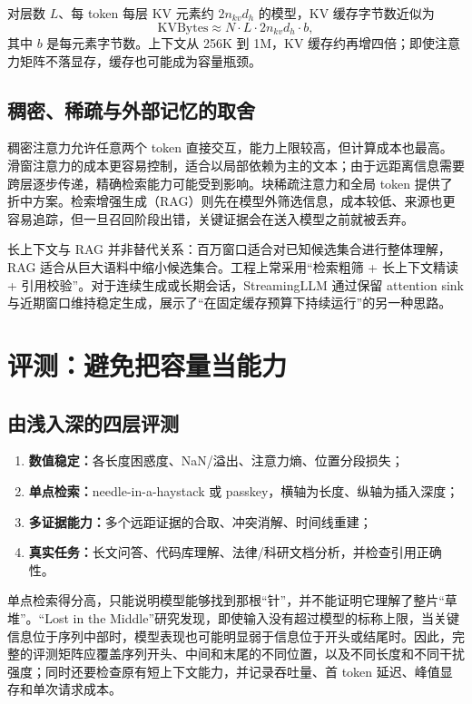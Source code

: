 \documentclass[UTF8,10pt,a4paper,fontset=none]{ctexart}
\newcommand{\key}[1]{\textbf{\color{navy}#1}}
\begin{document}
对层数 $L$、每 token 每层 KV 元素约 $2n_{kv}d_h$ 的模型，KV 缓存字节数近似为
\begin{equation}
\mathrm{KVBytes}\approx N\cdot L\cdot 2n_{kv}d_h\cdot b,
\end{equation}
其中 $b$ 是每元素字节数。上下文从 256K 到 1M，KV 缓存约再增四倍；即使注意力矩阵不落显存，缓存也可能成为容量瓶颈。

\subsection{稠密、稀疏与外部记忆的取舍}
稠密注意力允许任意两个 token 直接交互，能力上限较高，但计算成本也最高。滑窗注意力的成本更容易控制，适合以局部依赖为主的文本；由于远距离信息需要跨层逐步传递，精确检索能力可能受到影响。块稀疏注意力和全局 token 提供了折中方案。检索增强生成（RAG）则先在模型外筛选信息，成本较低、来源也更容易追踪，但一旦召回阶段出错，关键证据会在送入模型之前就被丢弃。

长上下文与 RAG 并非替代关系：百万窗口适合对已知候选集合进行整体理解，RAG 适合从巨大语料中缩小候选集合。工程上常采用“检索粗筛 + 长上下文精读 + 引用校验”。对于连续生成或长期会话，StreamingLLM 通过保留 attention sink 与近期窗口维持稳定生成，展示了“在固定缓存预算下持续运行”的另一种思路\cite{xiao2023streamingllm}。

\section{评测：避免把容量当能力}
\subsection{由浅入深的四层评测}
\begin{enumerate}
\item \key{数值稳定：}各长度困惑度、NaN/溢出、注意力熵、位置分段损失；
\item \key{单点检索：}needle-in-a-haystack 或 passkey，横轴为长度、纵轴为插入深度；
\item \key{多证据能力：}多个远距证据的合取、冲突消解、时间线重建；
\item \key{真实任务：}长文问答、代码库理解、法律/科研文档分析，并检查引用正确性。
\end{enumerate}
单点检索得分高，只能说明模型能够找到那根“针”，并不能证明它理解了整片“草堆”。“Lost in the Middle”研究发现，即使输入没有超过模型的标称上限，当关键信息位于序列中部时，模型表现也可能明显弱于信息位于开头或结尾时\cite{liu2023lostmiddle}。因此，完整的评测矩阵应覆盖序列开头、中间和末尾的不同位置，以及不同长度和不同干扰强度；同时还要检查原有短上下文能力，并记录吞吐量、首 token 延迟、峰值显存和单次请求成本。
\end{document}
